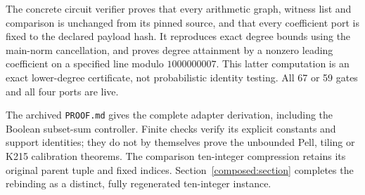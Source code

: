 The concrete circuit verifier proves that every arithmetic graph,
witness list and comparison is unchanged from its pinned source, and
that every coefficient port is fixed to the declared payload hash.
It reproduces exact degree bounds using the main-norm cancellation,
and proves degree attainment by a nonzero leading coefficient on a
specified line modulo $1000000007$.  This latter computation is an
exact lower-degree certificate, not probabilistic identity testing.
All 67 or 59 gates and all four ports are live.

The archived \texttt{PROOF.md} gives the complete adapter derivation,
including the Boolean subset-sum controller.  Finite checks verify its
explicit constants and support identities; they do not by themselves
prove the unbounded Pell, tiling or K215 calibration theorems.  The
comparison ten-integer compression retains its original parent tuple
and fixed indices.  Section~\ref{composed:section} completes the
rebinding as a distinct, fully regenerated ten-integer instance.
